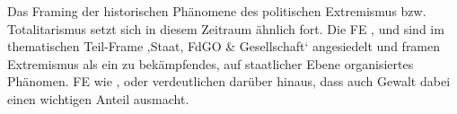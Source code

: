 Das Framing der historischen Phänomene des politischen Extremismus bzw. Totalitarismus setzt sich in diesem Zeitraum ähnlich fort. Die FE  ,  und  sind im thematischen Teil-Frame ‚Staat, FdGO \& Gesellschaft` angesiedelt und framen Extremismus als ein zu bekämpfendes, auf staatlicher Ebene organisiertes Phänomen. FE wie ,  oder  verdeutlichen darüber hinaus, dass auch Gewalt dabei einen wichtigen Anteil ausmacht.

